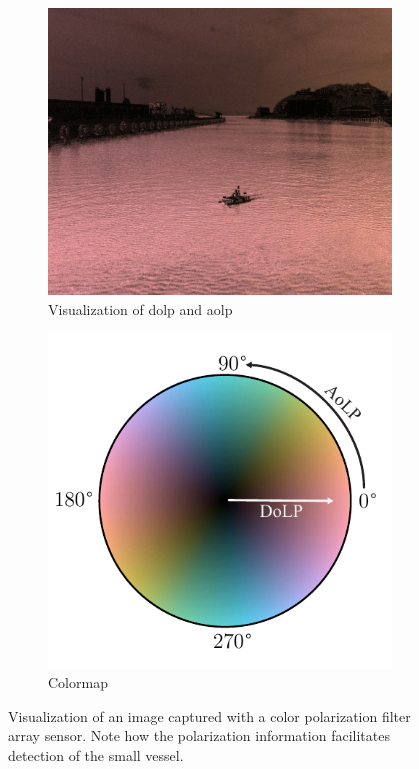 \begin{figure}[H]
    \begin{subfigure}[B]{.49\textwidth}
        \includegraphics[width=\textwidth]{figures/img_0080_right_pol.jpg}
        \caption{Visualization of \gls{dolp} and \gls{aolp}}
    \end{subfigure}
    \hfill
    \begin{subfigure}[B]{.49\textwidth}
        \centering
        \includegraphics[width=.8\textwidth]{figures/cmap/aolp_dolp_cmap.pdf}
        \vspace{1em}
        \caption{Colormap}
    \end{subfigure}
    \caption{Visualization of an image captured with a color polarization filter array sensor. Note how the polarization information facilitates detection of the small vessel.}
\end{figure}




